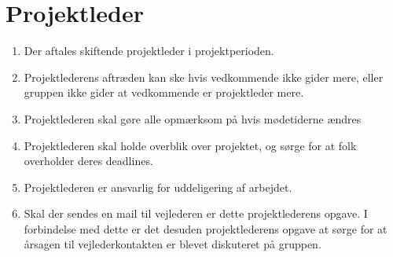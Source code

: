 \section{Projektleder}
\begin{enumerate}
\item{Der aftales skiftende projektleder i projektperioden.}
\item{Projektlederens aftræden kan ske hvis vedkommende ikke gider mere, eller gruppen ikke gider at
vedkommende er projektleder mere.}
\item{Projektlederen skal gøre alle opmærksom på hvis mødetiderne ændres}
\item{Projektlederen skal holde overblik over projektet, og sørge for at folk overholder deres deadlines.}
\item Projektlederen er ansvarlig for uddeligering af arbejdet.
\item Skal der sendes en mail til vejlederen er dette projektlederens opgave. I forbindelse med dette er det desuden projektlederens opgave at sørge for at årsagen til vejlederkontakten er blevet diskuteret på gruppen.
\end{enumerate}
